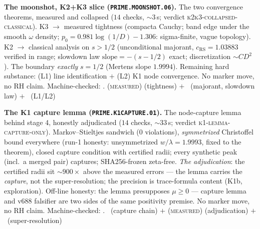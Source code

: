 \par\smallskip\noindent\textbf{The moonshot, K2+K3 slice
(\texttt{PRIME.MOONSHOT.06}).}
The two convergence theorems, measured and collapsed ($14$ checks,
${\sim}3$\,s; verdict \textsc{k2k3-collapsed-classical}).  K3
$\to$ measured tightness (compacta Cauchy; band edge under the
smooth $\omega$ density; $p_0=0.981\log(1/D)-1.306$: sigma-finite,
vague topology).  K2 $\to$ classical analysis on $s>1/2$
(unconditional majorant, $c_{\mathrm{RS}}=1.03883$ verified in
range; slowdown law $\mathrm{slope}=-(s-1/2)$ exact; discretization
$\sim CD^2$).  The boundary \emph{exactly} $s=1/2$ (Mertens slope
$1.9994$).  Remaining hard substance: (L1) line identification $+$
(L2) K1 node convergence.  No marker move, no RH claim.
Machine-checked: .
(\textsc{measured}) (tightness) $+$ \mE\ (majorant, slowdown law) $+$
\mO\ (L1/L2)
\par\smallskip


\par\smallskip\noindent\textbf{The K1 capture lemma
(\texttt{PRIME.K1CAPTURE.01}).}
The node-capture lemma behind stage 4, honestly adjudicated ($14$
checks, ${\sim}33$\,s; verdict \textsc{k1-lemma-capture-only}).
Markov--Stieltjes sandwich ($0$ violations), \emph{symmetrized}
Christoffel bound everywhere (run-1 honesty: unsymmetrized
$w/\lambda=1.9993$, fixed to the theorem), closed capture condition
with certified radii; every synthetic peak (incl.\ a merged pair)
captures; SHA256-frozen zeta-free.  \emph{The adjudication}: the
certified radii sit ${\sim}900\times$ above the measured errors ---
the lemma carries the \emph{capture}, not the super-resolution; the
precision is trace-formula content (K1b, exploration).  Off-line
honesty: the lemma presupposes $\mu\ge0$ --- capture lemma and v688
falsifier are two sides of the same positivity premise.  No marker
move, no RH claim.
Machine-checked: .
\mE\ (capture chain) $+$ (\textsc{measured}) (adjudication) $+$ \mO\
(super-resolution)
\par\smallskip


